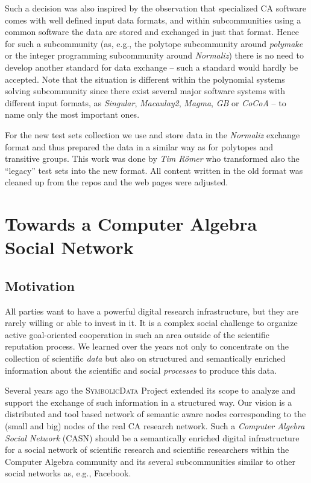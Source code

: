 \documentclass[a4paper,11pt]{article}
\def\SD{\textsc{SymbolicData}}
\begin{document}
Such a decision was also inspired by the observation that specialized CA
software comes with well defined input data formats, and within subcommunities
using a common software the data are stored and exchanged in just that format.
Hence for such a subcommunity (as, e.g., the polytope subcommunity around
\emph{polymake} or the integer programming subcommunity around \emph{Normaliz})
there is no need to develop another standard for data exchange -- such a
standard would hardly be accepted.  Note that the situation is different within
the polynomial systems solving subcommunity since there exist several major
software systems with different input formats, as \emph{Singular},
\emph{Macaulay2}, \emph{Magma}, \emph{GB} or \emph{CoCoA} -- to name only the
most important ones.

For the new test sets collection we use and store data in the \emph{Normaliz}
exchange format and thus prepared the data in a similar way as for polytopes
and transitive groups. This work was done by \emph{Tim R\"omer} who transformed
also the ``legacy'' test sets into the new format.  All content written in the
old format was cleaned up from the repos and the web pages were adjusted.

\section{Towards a Computer Algebra Social Network}

\subsection{Motivation}

All parties want to have a powerful digital research infrastructure, but they
are rarely willing or able to invest in it.  It is a complex social challenge
to organize active goal-oriented cooperation in such an area outside of the
scientific reputation process. We learned over the years not only to
concentrate on the collection of scientific \emph{data} but also on structured
and semantically enriched information about the scientific and social
\emph{processes} to produce this data.

Several years ago the {\SD} Project extended its scope to analyze and support
the exchange of such information in a structured way.  Our vision is a
distributed and tool based network of semantic aware nodes corresponding to the
(small and big) nodes of the real CA research network.  Such a \emph{Computer
  Algebra Social Network} (CASN) should be a semantically enriched digital
infrastructure for a social network of scientific research and scientific
researchers within the Computer Algebra community and its several
subcommunities similar to other social networks as, e.g., Facebook.
\end{document}
